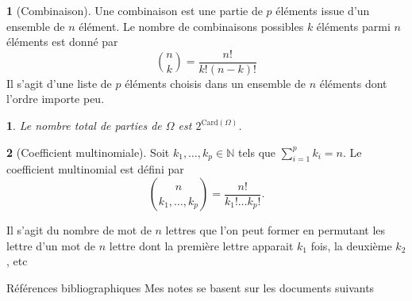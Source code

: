 \documentclass[8pt,notheorems]{beamer}
\def \N{\mathbb N}
\newtheorem{prop}{\translate{Proposition}}
\theoremstyle{definition}
\newtheorem{definition}{\translate{Definition}}
\theoremstyle{example}
\theoremstyle{mystyle}
\theoremstyle{plain}
\begin{document}
\begin{frame}[allowframebreaks]
\begin{definition}[Combinaison]
Une combinaison est une partie de $p$ éléments issue d'un ensemble de $n$ élément. Le nombre de combinaisons possibles $k$ éléments parmi $n$ éléments est donné par 
$$
\binom{n}{k} = \frac{n!}{k!(n-k)!}
$$
Il s'agit d'une liste de $p$ éléments choisis dans un ensemble de $n$ éléments dont l'ordre importe peu. 
\end{definition}
\begin{prop}
Le nombre total de parties de $\Omega$ est $2^{\text{Card}(\Omega)}$.
\end{prop}
\begin{definition}[Coefficient multinomiale]
Soit $k_1,\ldots, k_p \in\N$ tels que $\sum_{i = 1}^{p} k_i = n$. 
Le coefficient multinomial est défini par
$$
\binom{n}{k_1,\ldots, k_p} = \frac{n!}{k_1!\ldots k_p!}.
$$
\end{definition}
Il s'agit du nombre de mot de $n$ lettres que l'on peut former en permutant les lettre d'un mot de $n$ lettre dont la première lettre apparait $k_1$ fois, la deuxième $k_2$, etc
\end{frame}

\begin{frame}[allowframebreaks]{Références bibliographiques}
Mes notes se basent sur les documents suivants \cite{Ca09,le2006integration,GaKu11}


\end{frame}
\end{document}
